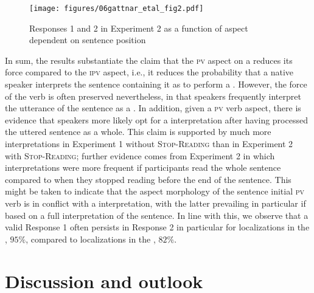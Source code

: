 \documentclass[output=paper,colorlinks,citecolor=brown,newtxmath,hidelinks]{langscibook}
\begin{document}
\begin{figure}
\texttt{[image: figures/06gattnar\_etal\_fig2.pdf]}
\caption{Responses 1 and 2 in Experiment 2 as a function of aspect dependent on sentence position}
\label{fig:zwei}
\end{figure}

In sum, the results substantiate the claim that the \textsc{pv} aspect on a  reduces its  force compared to the \textsc{ipv} aspect, i.e., it reduces the probability that a native speaker interprets the sentence containing it as to perform a . However, the  force of the verb is often preserved nevertheless, in that speakers frequently interpret the utterance of the sentence as a . In addition, given a \textsc{pv} verb aspect, there is evidence that speakers more likely opt for a  interpretation after having processed the uttered sentence as a whole. This claim is supported by much more  interpretations in Experiment 1 without \textsc{Stop-Reading} than in Experiment 2 with \textsc{Stop-Reading}; further evidence comes from Experiment 2 in which  interpretations were more frequent if participants read the whole sentence compared to when they stopped reading before the end of the sentence. This might be taken to indicate that the aspect morphology of the sentence initial \textsc{pv} verb is in conflict with a  interpretation, with the latter prevailing in particular if based on a full interpretation of the sentence. In line with this, we observe that a valid Response 1 often persists in Response 2 in particular for localizations in the , $95\%$, compared to localizations in the , $82\%$.

\section{Discussion and outlook}\label{sct:drei}
\end{document}
